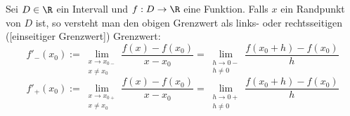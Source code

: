 Sei $D \in \R$ ein Intervall und $f: D \to \R$ eine Funktion. Falls $x$ ein Randpunkt von $D$ ist, so versteht man den obigen Grenzwert als links- oder rechtsseitigen ([einseitiger Grenzwert]) Grenzwert:
$$f'_-(x_0) := \lim_{\substack{x \to x_{0-} \\ x \neq x_0}} \frac{f(x)-f(x_0)}{x-x_0} = \lim_{\substack{h \to 0- \\ h \neq 0}} \frac{f(x_0+h)-f(x_0)}{h}$$
$$f'_+(x_0) := \lim_{\substack{x \to x_{0+} \\ x \neq x_0}} \frac{f(x)-f(x_0)}{x-x_0} = \lim_{\substack{h \to 0+ \\ h \neq 0}} \frac{f(x_0+h)-f(x_0)}{h}$$
